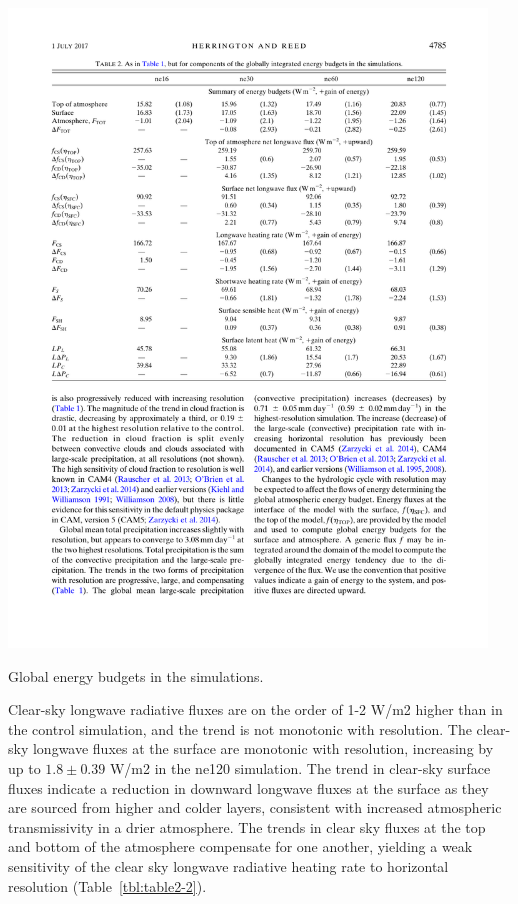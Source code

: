 \begin{table}[t]
\begin{center}
\noindent\includegraphics[width=30pc,angle=0]{chapter2/table2.pdf}\\
\end{center}
\caption{Global energy budgets in the simulations.}
\label{tbl:table2-2}
\end{table}

Clear-sky longwave radiative fluxes are on the order of 1-2 W/m2 higher than in the control simulation, and the trend is not monotonic with resolution. The clear-sky longwave fluxes at the surface are monotonic with resolution, increasing by up to $1.8 \pm 0.39$ W/m2 in the ne120 simulation. The trend in clear-sky surface fluxes indicate a reduction in downward longwave fluxes at the surface as they are sourced from higher and colder layers, consistent with increased atmospheric transmissivity in a drier atmosphere. The trends in clear sky fluxes at the top and bottom of the atmosphere compensate for one another, yielding a weak sensitivity of the clear sky longwave radiative heating rate to horizontal resolution (Table~\ref{tbl:table2-2}).

